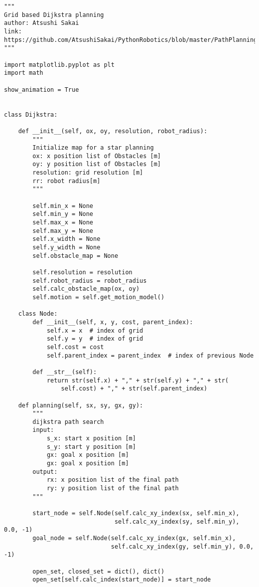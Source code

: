 \begin{lstlisting}[caption=Grid based Dijkstra planning (Atsushi's project)(\autoref{Pathfinding}), label=Atsushi]
"""
Grid based Dijkstra planning
author: Atsushi Sakai
link: https://github.com/AtsushiSakai/PythonRobotics/blob/master/PathPlanning/Dijkstra/dijkstra.py
"""

import matplotlib.pyplot as plt
import math

show_animation = True


class Dijkstra:

    def __init__(self, ox, oy, resolution, robot_radius):
        """
        Initialize map for a star planning
        ox: x position list of Obstacles [m]
        oy: y position list of Obstacles [m]
        resolution: grid resolution [m]
        rr: robot radius[m]
        """

        self.min_x = None
        self.min_y = None
        self.max_x = None
        self.max_y = None
        self.x_width = None
        self.y_width = None
        self.obstacle_map = None

        self.resolution = resolution
        self.robot_radius = robot_radius
        self.calc_obstacle_map(ox, oy)
        self.motion = self.get_motion_model()

    class Node:
        def __init__(self, x, y, cost, parent_index):
            self.x = x  # index of grid
            self.y = y  # index of grid
            self.cost = cost
            self.parent_index = parent_index  # index of previous Node

        def __str__(self):
            return str(self.x) + "," + str(self.y) + "," + str(
                self.cost) + "," + str(self.parent_index)

    def planning(self, sx, sy, gx, gy):
        """
        dijkstra path search
        input:
            s_x: start x position [m]
            s_y: start y position [m]
            gx: goal x position [m]
            gx: goal x position [m]
        output:
            rx: x position list of the final path
            ry: y position list of the final path
        """

        start_node = self.Node(self.calc_xy_index(sx, self.min_x),
                               self.calc_xy_index(sy, self.min_y), 0.0, -1)
        goal_node = self.Node(self.calc_xy_index(gx, self.min_x),
                              self.calc_xy_index(gy, self.min_y), 0.0, -1)

        open_set, closed_set = dict(), dict()
        open_set[self.calc_index(start_node)] = start_node


\end{lstlisting}
